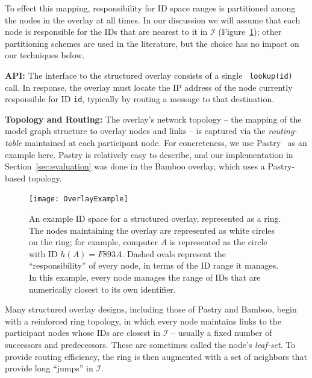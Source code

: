 \documentclass[10pt,twocolumn]{article}
\renewcommand{\paragraph}[1]{\textbf{#1:}}
\begin{document}
To effect this mapping, responsibility for ID space ranges is
partitioned among the nodes in the overlay at all times.  In our discussion we will
assume that each node is responsible for the IDs that are nearest to
it in $\mathcal{I}$ (Figure~\ref{fig:OverlayExample}); other partitioning
schemes are used in the literature, but the choice has no impact on
our techniques below.

\paragraph{API}
The interface to the structured overlay consists of a single {\tt
lookup(id)} call.  In response, the overlay must locate the IP
address of the node currently responsible for ID {\tt id}, typically by
routing a message to that destination.

\paragraph{Topology and Routing}
The overlay's network topology -- the mapping of the model graph
structure to overlay nodes and links -- is captured via the {\em routing-table}
maintained at each participant node.  For concreteness, we use Pastry~\cite{Rowstron2001} as an example
here.  Pastry is relatively easy to describe, and our implementation in
Section~\ref{sec:evaluation} was done in the Bamboo overlay, which uses a
Pastry-based topology.

\begin{figure}
\centerline{\texttt{[image: OverlayExample]}}
\caption{An example ID space for a structured overlay, represented as a ring.
  The nodes maintaining the overlay are represented as white circles on the
  ring; for example, computer $A$ is represented as the circle with
  ID $h(A)=F893A$. Dashed ovals represent the
  ``responsibility'' of every node, in terms of the ID range it
  manages.  In this example, every node manages the range of IDs that
  are numerically closest to its own identifier.}
\label{fig:OverlayExample}
\end{figure}


Many structured overlay designs, including those of Pastry and Bamboo, begin with a
reinforced ring topology, in which every node maintains links to the
participant nodes whose IDs are closest in $\mathcal{I}$ -- usually a
fixed number of successors and predecessors.  These are sometimes
called the node's \emph{leaf-set}.  To provide routing efficiency, the ring is then
augmented with a set of neighbors that provide long ``jumps'' in
$\mathcal{I}$.
\end{document}
